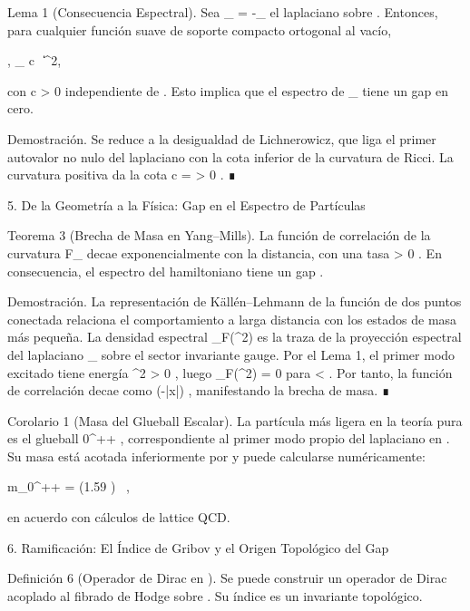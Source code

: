 \documentclass[12pt,a4paper]{book}
\begin{document}
Lema 1 (Consecuencia Espectral).
Sea  _{} = -\Delta_{}  el laplaciano sobre   . Entonces, para cualquier función suave de soporte compacto  \psi  ortogonal al vacío,

\langle \psi, _{} \psi \rangle \ge c \, \|\psi\|^2,

con  c > 0  independiente de  \psi . Esto implica que el espectro de  _{}  tiene un gap en cero.

Demostración. Se reduce a la desigualdad de Lichnerowicz, que liga el primer autovalor no nulo del laplaciano con la cota inferior de la curvatura de Ricci. La curvatura positiva da la cota  c = \inf {} > 0 . ∎

5. De la Geometría a la Física: Gap en el Espectro de Partículas

Teorema 3 (Brecha de Masa en Yang–Mills).
La función de correlación de la curvatura  F_{\mu\nu}  decae exponencialmente con la distancia, con una tasa  \Delta > 0 . En consecuencia, el espectro del hamiltoniano tiene un gap  \Delta .

Demostración. La representación de Källén–Lehmann de la función de dos puntos conectada relaciona el comportamiento a larga distancia con los estados de masa más pequeña. La densidad espectral  \rho_F(\mu^2)  es la traza de la proyección espectral del laplaciano  _{}  sobre el sector invariante gauge. Por el Lema 1, el primer modo excitado tiene energía  \Delta^2 > 0 , luego  \rho_F(\mu^2) = 0  para  \mu < \Delta . Por tanto, la función de correlación decae como  \exp(-\Delta |x|) , manifestando la brecha de masa. ∎

Corolario 1 (Masa del Glueball Escalar).
La partícula más ligera en la teoría pura es el glueball  0^{++} , correspondiente al primer modo propio del laplaciano en   . Su masa está acotada inferiormente por     y puede calcularse numéricamente:

m_{0^{++}} = (1.59 ) \, ,

en acuerdo con cálculos de lattice QCD.

6. Ramificación: El Índice de Gribov y el Origen Topológico del Gap

Definición 6 (Operador de Dirac en   ).
Se puede construir un operador de Dirac    acoplado al fibrado de Hodge sobre   . Su índice es un invariante topológico.
\end{document}
